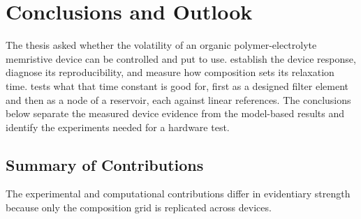 \documentclass[12pt, twoside]{report}
\begin{document}
  \setcounter{chapter}{5}     %
\fi

\providecommand{\SY}{\textit{Super Yellow}}
\providecommand{\Hybrane}{\textit{Hybrane}}
\providecommand{\PEO}{PEO}
\providecommand{\TMPE}{TMPE}
\providecommand{\LiTf}{LiOTf}
\providecommand{\ITO}{ITO}
\providecommand{\STM}{short-term memory}
\providecommand{\LTM}{long-term memory}
\providecommand{\STDP}{STDP}
\providecommand{\NARMA}{NARMA}
\providecommand{\WESAD}{WESAD}
\providecommand{\TMPE}{TMPE}
\providecommand{\twoterminal}{two-terminal}

\chapter{Conclusions and Outlook}\label{ch:conclusions}

The thesis asked whether the volatility of an organic polymer-electrolyte memristive device can be controlled and put to use.  establish the device response, diagnose its reproducibility, and measure how composition sets its relaxation time.  tests what that time constant is good for, first as a designed filter element and then as a node of a reservoir, each against linear references. The conclusions below separate the measured device evidence from the model-based results and identify the experiments needed for a hardware test.

\section{Summary of Contributions}\label{sec:concl_contributions}

The experimental and computational contributions differ in evidentiary strength because only the composition grid is replicated across devices.
\end{document}
